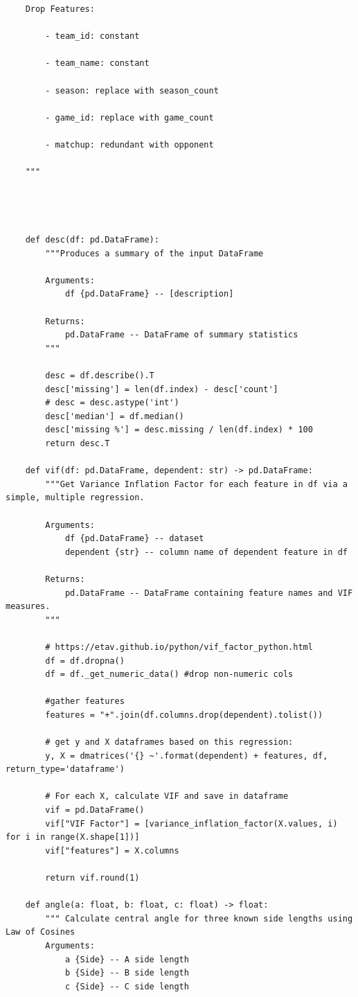\begin{verbatim}
    Drop Features:

        - team_id: constant

        - team_name: constant

        - season: replace with season_count

        - game_id: replace with game_count

        - matchup: redundant with opponent

    """




    def desc(df: pd.DataFrame):
        """Produces a summary of the input DataFrame

        Arguments:
            df {pd.DataFrame} -- [description]

        Returns:
            pd.DataFrame -- DataFrame of summary statistics
        """

        desc = df.describe().T
        desc['missing'] = len(df.index) - desc['count']
        # desc = desc.astype('int')
        desc['median'] = df.median()
        desc['missing %'] = desc.missing / len(df.index) * 100
        return desc.T

    def vif(df: pd.DataFrame, dependent: str) -> pd.DataFrame:
        """Get Variance Inflation Factor for each feature in df via a simple, multiple regression.

        Arguments:
            df {pd.DataFrame} -- dataset
            dependent {str} -- column name of dependent feature in df

        Returns:
            pd.DataFrame -- DataFrame containing feature names and VIF measures.
        """

        # https://etav.github.io/python/vif_factor_python.html
        df = df.dropna()
        df = df._get_numeric_data() #drop non-numeric cols

        #gather features
        features = "+".join(df.columns.drop(dependent).tolist())

        # get y and X dataframes based on this regression:
        y, X = dmatrices('{} ~'.format(dependent) + features, df, return_type='dataframe')

        # For each X, calculate VIF and save in dataframe
        vif = pd.DataFrame()
        vif["VIF Factor"] = [variance_inflation_factor(X.values, i) for i in range(X.shape[1])]
        vif["features"] = X.columns

        return vif.round(1)

    def angle(a: float, b: float, c: float) -> float:
        """ Calculate central angle for three known side lengths using Law of Cosines
        Arguments:
            a {Side} -- A side length
            b {Side} -- B side length
            c {Side} -- C side length


\end{verbatim}
